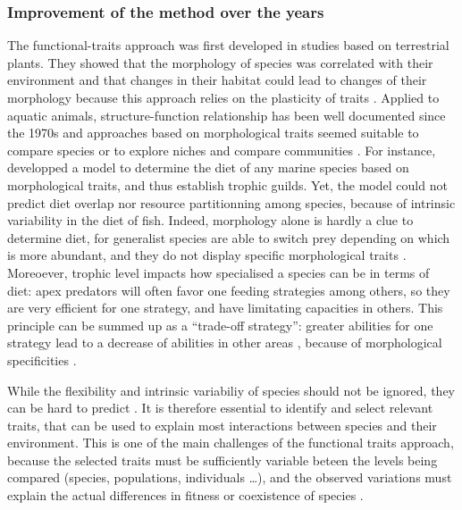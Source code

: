 \subsubsection{Improvement of the method over the years}
The functional-traits approach was first developed in studies based on terrestrial plants. They showed that the morphology of species was correlated with their environment and that changes in their habitat could lead to changes of their morphology because this approach relies on the plasticity of traits \citep{boissezon2014,lavorel1997,martini2020}. Applied to aquatic animals, structure-function relationship has been well documented since the 1970s \citep{gosline1971, lagler1977, webb1984} and approaches based on morphological traits  seemed suitable to compare species \citep{norton1995} or to explore niches and compare communities \citep{winemiller1991}. For instance, \citet{albouy2011} developped a model to determine the diet of any marine species based on morphological traits, and thus establish trophic guilds. Yet, the model could not predict diet overlap nor resource partitionning among species, because of intrinsic variability in the diet of fish. Indeed, morphology alone is hardly a clue to determine diet, for generalist species are able to switch prey depending on which  is more abundant, and they do not display specific morphological traits \citep{sibbing2000}. Moreoever, trophic level impacts how specialised a species can be in terms of diet: apex predators will often favor one feeding strategies among others, so they are very efficient for one strategy, and have limitating capacities in others. This principle can be summed up as a ``trade-off strategy'': greater abilities for one strategy lead to a decrease of abilities in other areas \citet{norton1995}, because of morphological specificities \citep{nagelkerke2018}.

While the flexibility and intrinsic variabiliy of species should not be ignored, they can be hard to predict \citep{diderich2006,martini2020}. It is therefore essential to identify and select relevant traits, that can be used to explain most interactions between species and their environment. This is one of the main challenges of the functional traits approach, because the selected traits must be sufficiently variable beteen the levels being compared (species, populations, individuals …), and the observed variations must explain the actual differences in fitness or coexistence of species \citep{kremer2017}. \\

